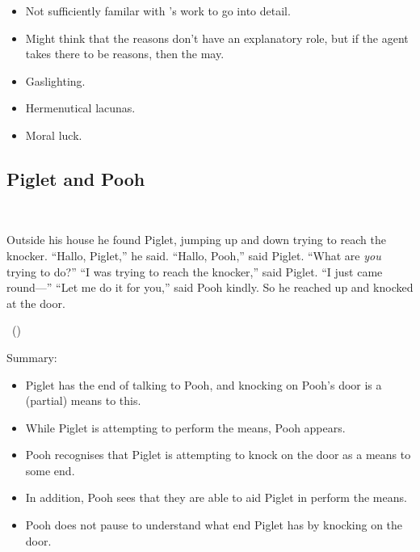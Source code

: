 \documentclass[10pt]{article}
\newcommand{\hozlinedash}[0]{%
  \noindent\hdashrule[0.5ex][c]{\textwidth}{.1pt}{2.5pt}
}
\begin{document}
  \begin{itemize}[noitemsep]
  \item Not sufficiently familar with \citeauthor{Arpaly:2003aa}'s work to go into detail.
  \item Might think that the reasons don't have an explanatory role, but if the agent takes there to be reasons, then the may.
  \end{itemize}

  \hozlinedash

\begin{itemize}
\item Gaslighting.
\item Hermenutical lacunas.
\item Moral luck.
\end{itemize}

\newpage

\subsection{Piglet and Pooh}
\label{sec:piglet-pooh}


\begin{scenario}\mbox{ }

  \noindent Outside his house he found Piglet, jumping up and down trying to reach the knocker.\newline
  ``Hallo, Piglet,'' he said.\newline
  ``Hallo, Pooh,'' said Piglet.\newline
  ``What are \emph{you} trying to do?''\newline
  ``I was trying to reach the knocker,'' said Piglet.
  ``I just came round---''\newline
  ``Let me do it for you,'' said Pooh kindly.
  So he reached up and knocked at the door.

  \mbox{ }\hfill\mbox{(\cite[77--78]{Milne:2009aa})}
\end{scenario}

\begin{center}
\end{center}

\hozlinedash

Summary:
\begin{itemize}[noitemsep]
\item Piglet has the end of talking to Pooh, and knocking on Pooh's door is a (partial) means to this.
\item While Piglet is attempting to perform the means, Pooh appears.
\item Pooh recognises that Piglet is attempting to knock on the door as a means to some end.
\item In addition, Pooh sees that they are able to aid Piglet in perform the means.
\item Pooh does not pause to understand what end Piglet has by knocking on the door.
\end{itemize}
\end{document}
